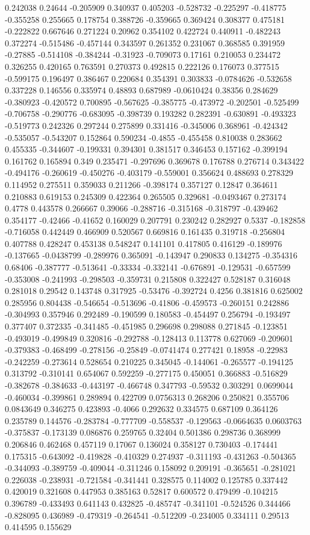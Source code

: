 0.242038 0.24644 -0.205909 0.340937 0.405203 -0.528732 -0.225297 -0.418775 -0.355258 0.255665 0.178754 0.388726 -0.359665 0.369424 0.308377 0.475181 -0.222822 0.667646 0.271224 0.20962 0.354102 0.422724 0.440911 -0.482243 0.372274 -0.515486 -0.457144 0.343597 0.261352 0.231067 0.368585 0.391959 -0.27885 -0.514108 -0.384244 -0.31923 -0.709073 0.17161 0.210053 0.234472 0.326255 0.420165 0.763591 0.270373 0.492815 0.222126 0.176073 0.377515 -0.599175 0.196497 0.386467 0.220684 0.354391 0.303833 -0.0784626 -0.532658 0.337228 0.146556 0.335974 0.48893 0.687989 -0.0610424 0.38356 0.284629 -0.380923 -0.420572 0.700895 -0.567625 -0.385775 -0.473972 -0.202501 -0.525499 -0.706758 -0.290776 -0.683095 -0.398739 0.193282 0.282391 -0.630891 -0.493323 -0.519773 0.242326 0.297244 0.275899 0.331416 -0.345006 0.368961 -0.424342 -0.535057 -0.543207 0.152864 0.590234 -0.4855 -0.455458 0.810038 0.283662 0.455335 -0.344607 -0.199331 0.394301 0.381517 0.346453 0.157162 -0.399194 0.161762 0.165894 0.349 0.235471 -0.297696 0.369678 0.176788 0.276714 0.343422 -0.494176 -0.260619 -0.450276 -0.403179 -0.559001 0.356624 0.488693 0.278329 0.114952 0.275511 0.359033 0.211266 -0.398174 0.357127 0.12847 0.364611 0.210883 0.619153 0.245309 0.422364 0.265505 0.329681 -0.0493467 0.273174 0.4778 0.443578 0.266667 0.39066 -0.288716 -0.315168 -0.318797 -0.439462 0.354177 -0.42466 -0.41652 0.160029 0.207791 0.230242 0.282927 0.5337 -0.182858 -0.716058 0.442449 0.466909 0.520567 0.669816 0.161435 0.319718 -0.256804 0.407788 0.428247 0.453138 0.548247 0.141101 0.417805 0.416129 -0.189976 -0.137665 -0.0438799 -0.289976 0.365091 -0.143947 0.290833 0.134275 -0.354316 0.68406 -0.387777 -0.513641 -0.33334 -0.332141 -0.676891 -0.129531 -0.657599 -0.353008 -0.241993 -0.298503 -0.359731 0.215808 0.322427 0.528187 0.316048 0.281018 0.29542 0.143748 0.317925 -0.53476 -0.392724 0.4256 0.381816 0.625002 0.285956 0.804438 -0.546654 -0.513696 -0.41806 -0.459573 -0.260151 0.242886 -0.304993 0.357946 0.292489 -0.190599 0.180583 -0.454497 0.256794 -0.193497 0.377407 0.372335 -0.341485 -0.451985 0.296698 0.298088 0.271845 -0.123851 -0.493019 -0.499849 0.320816 -0.292788 -0.128413 0.113778 0.627069 -0.209601 -0.379383 -0.468499 -0.278156 -0.25849 -0.0741474 0.277421 0.18958 -0.22983 -0.242259 -0.273614 0.528654 0.210225 0.345045 -0.144061 -0.265577 -0.194125 0.313792 -0.310141 0.654067 0.592259 -0.277175 0.450051 0.366883 -0.516829 -0.382678 -0.384633 -0.443197 -0.466748 0.347793 -0.59532 0.303291 0.0699044 -0.460034 -0.399861 0.289894 0.422709 0.0756313 0.268206 0.250821 0.355706 0.0843649 0.346275 0.423893 -0.4066 0.292632 0.334575 0.687109 0.364126 0.235789 0.144576 -0.283784 -0.777709 -0.558537 -0.129563 -0.0664635 0.0603763 -0.375837 -0.173139 0.086876 0.259765 0.32404 0.501386 0.298736 0.368999 0.206846 0.462468 0.457119 0.17067 0.136024 0.358127 0.730403 -0.174441 0.175315 -0.643092 -0.419828 -0.410329 0.274937 -0.311193 -0.431263 -0.504365 -0.344093 -0.389759 -0.409044 -0.311246 0.158092 0.209191 -0.365651 -0.281021 0.226038 -0.238931 -0.721584 -0.341441 0.328575 0.114002 0.125785 0.337442 0.420019 0.321608 0.447953 0.385163 0.52817 0.600572 0.479499 -0.104215 0.396789 -0.433493 0.641143 0.432825 -0.485747 -0.341101 -0.524526 0.344466 -0.828095 0.436989 -0.479319 -0.264541 -0.512209 -0.234005 0.334111 0.29513 0.414595 0.155629 